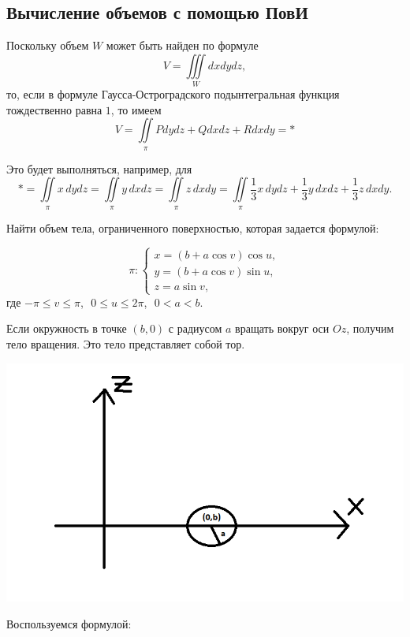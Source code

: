 \documentclass[../../main.tex]{subfiles}
\begin{document}
	
	
	\subsection{Вычисление объемов с помощью ПовИ}
	Поскольку объем $W$ может быть найден по формуле
	\[ V = \iiint \limits_W dx dy dz, \]
	то, если в формуле Гаусса-Остроградского подынтегральная функция тождественно равна $1$, то имеем
	\[ V = \iint \limits_{\pi} Pdydz+Qdxdz+Rdxdy = * \]
	
	Это будет выполняться, например, для
	\[ *=  \iint \limits_{\pi} x \, dydz = \iint \limits_{\pi} y \, dxdz = \iint \limits_{\pi} z \, dxdy = \iint \limits_{\pi}  \frac{1}{3} x \, dydz + \frac{1}{3} y \, dxdz + \frac{1}{3} z \, dxdy. \]
	
	\begin{example}
	
	Найти объем тела, ограниченного поверхностью, которая задается формулой:
	
	\[ \pi:\begin{cases} x=\left( b + a \cos{v} \right) \cos{u}, \\ 
	y = \left( b + a \cos{v} \right) \sin{u}, \\ 
	z= a \sin{v},
	\end{cases} \]
	где
	$- \pi \leq v \leq \pi$,\,\
	$0 \leq u \leq 2\pi$,\,\
	$0 < a < b$.
	
	Если окружность в точке $(b,0)$ с радиусом $a$ вращать вокруг оси $Oz$, получим тело вращения. Это тело представляет собой тор.
	\begin{center}
		\includegraphics[scale = 0.8]{lec_25_Thor_POVI}
	\end{center}
	
	Воспользуемся формулой:
	

\end{example}
\end{document}
